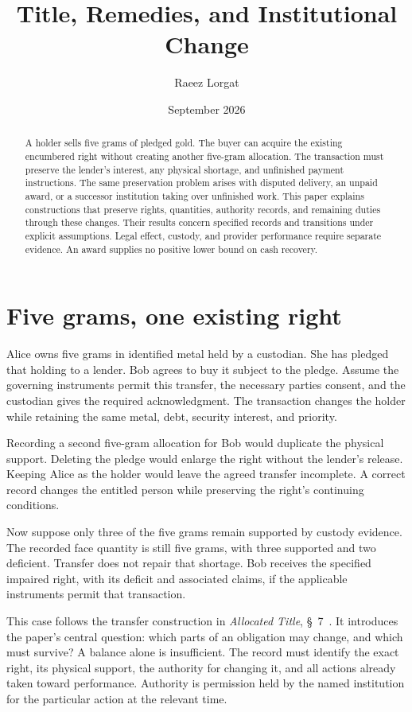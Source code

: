 \documentclass{momentum}
\title{Title, Remedies, and Institutional Change}
\author{Raeez Lorgat}
\date{September 2026}
\begin{document}
\maketitle

\begin{abstract}
A holder sells five grams of pledged gold. The buyer can acquire the existing encumbered right without creating another five-gram allocation. The transaction must preserve the lender's interest, any physical shortage, and unfinished payment instructions. The same preservation problem arises with disputed delivery, an unpaid award, or a successor institution taking over unfinished work. This paper explains constructions that preserve rights, quantities, authority records, and remaining duties through these changes. Their results concern specified records and transitions under explicit assumptions. Legal effect, custody, and provider performance require separate evidence. An award supplies no positive lower bound on cash recovery.
\end{abstract}

\section{Five grams, one existing right}

Alice owns five grams in identified metal held by a custodian. She has pledged that holding to a lender. Bob agrees to buy it subject to the pledge. Assume the governing instruments permit this transfer, the necessary parties consent, and the custodian gives the required acknowledgment. The transaction changes the holder while retaining the same metal, debt, security interest, and priority.

Recording a second five-gram allocation for Bob would duplicate the physical support. Deleting the pledge would enlarge the right without the lender's release. Keeping Alice as the holder would leave the agreed transfer incomplete. A correct record changes the entitled person while preserving the right's continuing conditions.

Now suppose only three of the five grams remain supported by custody evidence. The recorded face quantity is still five grams, with three supported and two deficient. Transfer does not repair that shortage. Bob receives the specified impaired right, with its deficit and associated claims, if the applicable instruments permit that transaction.

This case follows the transfer construction in \emph{Allocated Title}, \S~7~\cite{allocated-title}. It introduces the paper's central question: which parts of an obligation may change, and which must survive? A balance alone is insufficient. The record must identify the exact right, its physical support, the authority for changing it, and all actions already taken toward performance. Authority is permission held by the named institution for the particular action at the relevant time.
\end{document}
